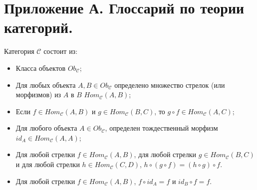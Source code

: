\section{Приложение А. Глоссарий по теории категорий.}

\begin{defin}

  Категория $\mathcal{C}$ состоит из:
  \begin{itemize}
    \item Класса объектов $Ob_{\mathcal{C}}$;
    \item Для любых объекта $A, B \in Ob_{\mathcal{C}}$ определено множество стрелок (или морфизмов) из $A$ в $B$ $Hom_{\mathcal{C}}(A, B)$;
    \item Если $f \in Hom_{\mathcal{C}}(A, B)$ и $g \in Hom_{\mathcal{C}}(B,C)$, то $g \circ f \in Hom_{\mathcal{C}}(A, C)$;
    \item Для любого объекта $A \in Ob_{\mathcal{C}}$, определен тождественный морфизм $id_A \in Hom_{\mathcal{C}}(A, A)$;
    \item Для любой стрелки $f \in Hom_{\mathcal{C}}(A, B)$, для любой стрелки $g \in Hom_{\mathcal{C}}(B,C)$ и для любой стрелки $h \in Hom_{\mathcal{C}}(C,D)$, $h \circ (g \circ f) = (h \circ g) \circ f$.
    \item Для любой стрелки $f \in Hom_{\mathcal{C}}(A, B)$, $f \circ id_A = f$ и $id_B \circ f = f$.
  \end{itemize}
\end{defin}


